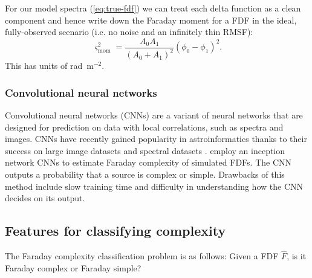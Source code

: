            For our model spectra (\autoref{eq:true-fdf}) we can treat each delta function as a clean component and hence write down the Faraday moment for a FDF in the ideal, fully-observed scenario (i.e. no noise and an infinitely thin RMSF):
            \begin{equation}
                \label{eq:faraday-model-moment}
                \varsigma_{\mathrm{mom}}^2 = \frac{A_0A_1}{(A_0 + A_1)^2} (\phi_0 - \phi_1)^2.
            \end{equation}
            This has units of rad~m$^{-2}$.

        \subsubsection{Convolutional neural networks}
        \label{sec:faraday-cnns}

          Convolutional neural networks (CNNs) are a variant of neural networks that are designed for prediction on data with local correlations, such as spectra and images. CNNs have recently gained popularity in astroinformatics thanks to their success on large image datasets \citep[e.g.][]{lukic18compact} and spectral datasets \citep[e.g.][]{muthukrishna19dash}. \citet{brown_classifying_2018} employ an inception network \citep{szegedy15deeper} CNNs to estimate Faraday complexity of simulated FDFs. The CNN outputs a probability that a source is complex or simple. Drawbacks of this method include slow training time and difficulty in understanding how the CNN decides on its output.

    \subsection{Features for classifying complexity}
    \label{sec:faraday-scores-method}

      The Faraday complexity classification problem is as follows: Given a FDF $\hat F$, is it Faraday complex or Faraday simple?

